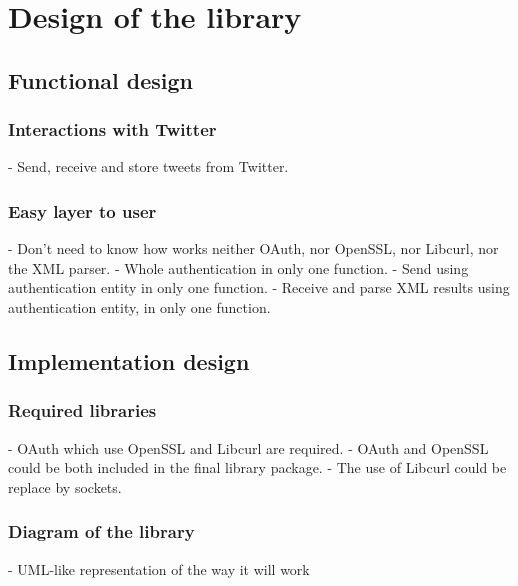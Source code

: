 \chapter{Design of the library}


\section{Functional design}

\subsection{Interactions with Twitter}

- Send, receive and store tweets from Twitter.


\subsection{Easy layer to user}

- Don't need to know how works neither OAuth, nor OpenSSL, nor Libcurl, nor the XML parser.
- Whole authentication in only one function.
- Send using authentication entity in only one function.
- Receive and parse XML results using authentication entity, in only one function.


\section{Implementation design}

\subsection{Required libraries}

- OAuth which use OpenSSL and Libcurl are required.
- OAuth and OpenSSL could be both included in the final library package.
- The use of Libcurl could be replace by sockets.


\subsection{Diagram of the library}

- UML-like representation of the way it will work



\clearpage